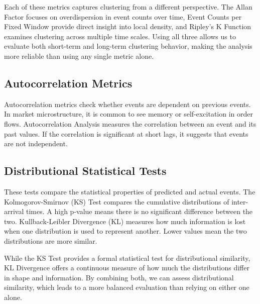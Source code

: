 Each of these metrics captures clustering from a different perspective. The Allan Factor focuses on overdispersion in event counts over time, Event Counts per Fixed Window provide direct insight into local density, and Ripley's K Function examines clustering across multiple time scales. Using all three allows us to evaluate both short-term and long-term clustering behavior, making the analysis more reliable than using any single metric alone.

\subsection{Autocorrelation Metrics}
Autocorrelation metrics check whether events are dependent on previous events. In market microstructure, it is common to see memory or self-excitation in order flows. Autocorrelation Analysis measures the correlation between an event and its past values. If the correlation is significant at short lags, it suggests that events are not independent.

\subsection{Distributional Statistical Tests}
These tests compare the statistical properties of predicted and actual events. The Kolmogorov-Smirnov (KS) Test compares the cumulative distributions of inter-arrival times. A high p-value means there is no significant difference between the two. Kullback-Leibler Divergence (KL) measures how much information is lost when one distribution is used to represent another. Lower values mean the two distributions are more similar.

While the KS Test provides a formal statistical test for distributional similarity, KL Divergence offers a continuous measure of how much the distributions differ in shape and information. By combining both, we can assess distributional similarity, which leads to a more balanced evaluation than relying on either one alone.


